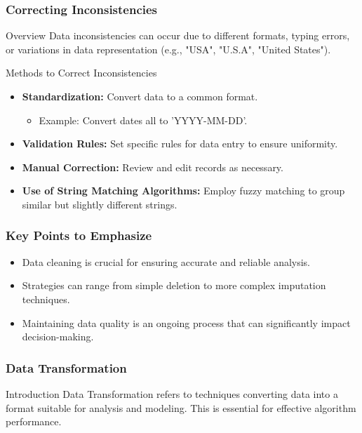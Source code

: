 \documentclass{beamer}
\begin{document}
\begin{frame}
    \frametitle{Correcting Inconsistencies}
    \begin{block}{Overview}
        Data inconsistencies can occur due to different formats, typing errors, or variations in data representation (e.g., "USA", "U.S.A", "United States").
    \end{block}

    \begin{block}{Methods to Correct Inconsistencies}
        \begin{itemize}
            \item \textbf{Standardization:} Convert data to a common format.
            \begin{itemize}
                \item Example: Convert dates all to 'YYYY-MM-DD'.
            \end{itemize}
            \item \textbf{Validation Rules:} Set specific rules for data entry to ensure uniformity.
            \item \textbf{Manual Correction:} Review and edit records as necessary.
            \item \textbf{Use of String Matching Algorithms:} Employ fuzzy matching to group similar but slightly different strings.
        \end{itemize}
    \end{block}
\end{frame}

\begin{frame}
    \frametitle{Key Points to Emphasize}
    \begin{itemize}
        \item Data cleaning is crucial for ensuring accurate and reliable analysis.
        \item Strategies can range from simple deletion to more complex imputation techniques.
        \item Maintaining data quality is an ongoing process that can significantly impact decision-making.
    \end{itemize}
\end{frame}

\begin{frame}[fragile]
    \frametitle{Data Transformation}
    \begin{block}{Introduction}
        Data Transformation refers to techniques converting data into a format suitable for analysis and modeling. 
        This is essential for effective algorithm performance. 
    \end{block}
\end{frame}
\end{document}
